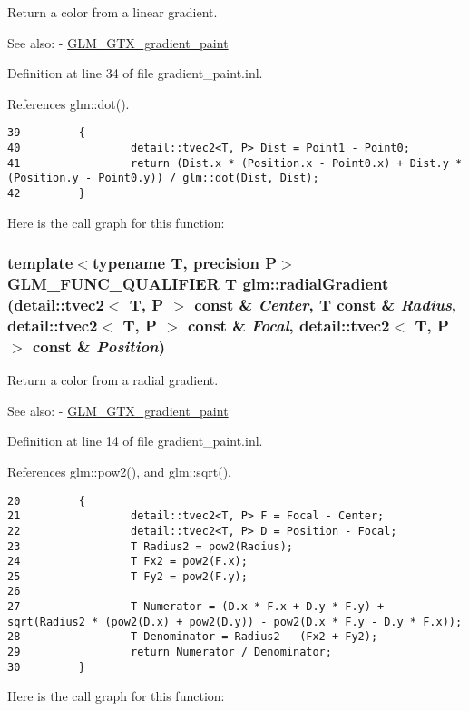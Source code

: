 Return a color from a linear gradient. \begin{Desc}
\item[See also:]- \hyperlink{group__gtx__gradient__paint}{GLM\_\-GTX\_\-gradient\_\-paint} \end{Desc}


Definition at line 34 of file gradient\_\-paint.inl.

References glm::dot().

\begin{Code}\begin{verbatim}39         {
40                 detail::tvec2<T, P> Dist = Point1 - Point0;
41                 return (Dist.x * (Position.x - Point0.x) + Dist.y * (Position.y - Point0.y)) / glm::dot(Dist, Dist);
42         }
\end{verbatim}
\end{Code}




Here is the call graph for this function:\hypertarget{group__gtx__gradient__paint_g5e9373dad017d6547ce8db966d02394e}{
\subsubsection[radialGradient]{\setlength{\rightskip}{0pt plus 5cm}template$<$typename T, precision P$>$ GLM\_\-FUNC\_\-QUALIFIER T glm::radialGradient (detail::tvec2$<$ T, P $>$ const \& {\em Center}, \/  T const \& {\em Radius}, \/  detail::tvec2$<$ T, P $>$ const \& {\em Focal}, \/  detail::tvec2$<$ T, P $>$ const \& {\em Position})}}
\label{group__gtx__gradient__paint_g5e9373dad017d6547ce8db966d02394e}


Return a color from a radial gradient. \begin{Desc}
\item[See also:]- \hyperlink{group__gtx__gradient__paint}{GLM\_\-GTX\_\-gradient\_\-paint} \end{Desc}


Definition at line 14 of file gradient\_\-paint.inl.

References glm::pow2(), and glm::sqrt().

\begin{Code}\begin{verbatim}20         {
21                 detail::tvec2<T, P> F = Focal - Center;
22                 detail::tvec2<T, P> D = Position - Focal;
23                 T Radius2 = pow2(Radius);
24                 T Fx2 = pow2(F.x);
25                 T Fy2 = pow2(F.y);
26 
27                 T Numerator = (D.x * F.x + D.y * F.y) + sqrt(Radius2 * (pow2(D.x) + pow2(D.y)) - pow2(D.x * F.y - D.y * F.x));
28                 T Denominator = Radius2 - (Fx2 + Fy2);
29                 return Numerator / Denominator;
30         }
\end{verbatim}
\end{Code}




Here is the call graph for this function: